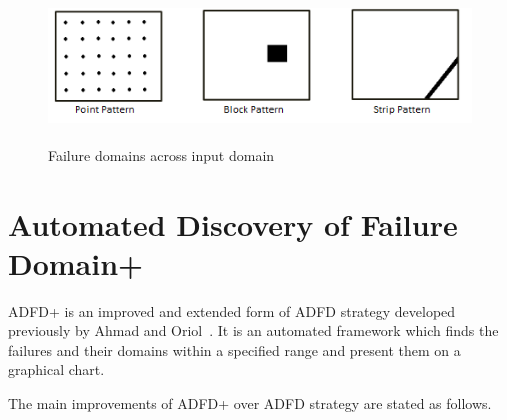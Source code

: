 \begin{figure}[ht]                                    
\centering
\includegraphics[width=12cm,height=4cm]{chapter6/ART_Patterns.png}
\caption{Failure domains across input domain~\cite{chan1996proportional}}
\label{fig:failurePatterns}
\end{figure}



 


\section{Automated Discovery of Failure Domain+}\label{sec:adfd+}\label{sec:intro6_2}
ADFD+ is an improved and extended form of ADFD strategy developed previously by Ahmad and Oriol~\cite{ahmad2013adfd}. It is an automated framework which finds the failures and their domains within a specified range and present them on a graphical chart. 

The main improvements of ADFD+ over ADFD strategy are stated as follows.

